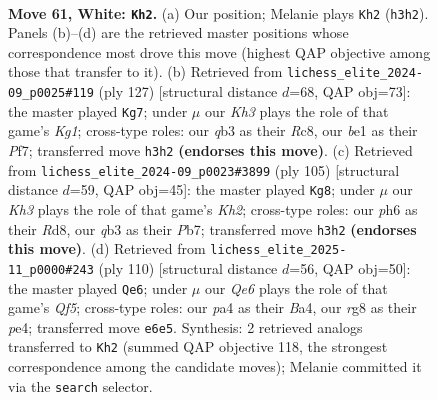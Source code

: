 \documentclass[11pt]{article}
\begin{document}
\clearpage

\begin{figure}[p]\centering
\begin{subfigure}{0.46\textwidth}\centering
\resizebox{\linewidth}{!}{%
\newchessgame
\chessboard[
  setfen={1r4r1/p5p1/4Q2p/1k1p3P/p2P2P1/1q2P2K/8/4bN2 w - - 30 61},
  showmover=false,
  pgfstyle=straightmove, color=movearrow, markmove={h3-h2}
]}
\caption{}
\end{subfigure}\hfill
\begin{subfigure}{0.46\textwidth}\centering
\resizebox{\linewidth}{!}{%
\newchessgame
\chessboard[
  setfen={2r3k1/5p2/2P1p1p1/4q1Pn/4P3/2R1QK2/2R5/8 b - - 4 64},
  showmover=false,
  pgfstyle=straightmove, color=movearrow, markmove={g8-g7}
]}
\caption{}
\end{subfigure}
\\[4pt]
\begin{subfigure}{0.46\textwidth}\centering
\resizebox{\linewidth}{!}{%
\newchessgame
\chessboard[
  setfen={3r4/1p3p1k/1P1p2p1/p2P3p/P1P5/2Q1R2P/5qPK/8 b - - 15 53},
  showmover=false,
  pgfstyle=straightmove, color=movearrow, markmove={h7-g8}
]}
\caption{}
\end{subfigure}\hfill
\begin{subfigure}{0.46\textwidth}\centering
\resizebox{\linewidth}{!}{%
\newchessgame
\chessboard[
  setfen={3r1k2/4q3/1R1p1p1p/p1pP1Q2/B1P1p1P1/6K1/8/8 w - - 0 56},
  showmover=false,
  pgfstyle=straightmove, color=movearrow, markmove={f5-e6}
]}
\caption{}
\end{subfigure}
\caption{\textbf{Move 61, White: \texttt{Kh2}.} (a) Our position; Melanie plays \texttt{Kh2} (\texttt{h3h2}). Panels (b)--(d) are the retrieved master positions whose correspondence most drove this move (highest QAP objective among those that transfer to it). (b) Retrieved from \texttt{lichess\_elite\_2024-09\_p0025\#119} (ply 127) [structural distance $d$=68, QAP obj=73]: the master played \texttt{Kg7}; under $\mu$ our \emph{Kh3} plays the role of that game's \emph{Kg1}; cross-type roles: our \emph{q}b3 as their \emph{R}c8, our \emph{b}e1 as their \emph{P}f7; transferred move \texttt{h3h2} \textbf{(endorses this move)}. (c) Retrieved from \texttt{lichess\_elite\_2024-09\_p0023\#3899} (ply 105) [structural distance $d$=59, QAP obj=45]: the master played \texttt{Kg8}; under $\mu$ our \emph{Kh3} plays the role of that game's \emph{Kh2}; cross-type roles: our \emph{p}h6 as their \emph{R}d8, our \emph{q}b3 as their \emph{P}b7; transferred move \texttt{h3h2} \textbf{(endorses this move)}. (d) Retrieved from \texttt{lichess\_elite\_2025-11\_p0000\#243} (ply 110) [structural distance $d$=56, QAP obj=50]: the master played \texttt{Qe6}; under $\mu$ our \emph{Qe6} plays the role of that game's \emph{Qf5}; cross-type roles: our \emph{p}a4 as their \emph{B}a4, our \emph{r}g8 as their \emph{p}e4; transferred move \texttt{e6e5}. Synthesis: 2 retrieved analogs transferred to \texttt{Kh2} (summed QAP objective 118, the strongest correspondence among the candidate moves); Melanie committed it via the \texttt{search} selector.}
\label{fig:thought-m120}
\end{figure}
\end{document}
